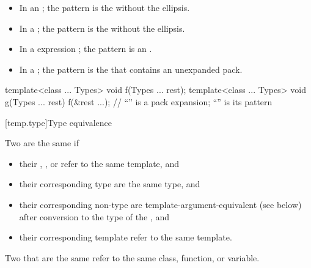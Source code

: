 \documentclass{wg21}
\begin{document}
\begin{itemize}
\item In an  ; the pattern is
the  without the ellipsis.

\item In a  ; the pattern is
the  without the ellipsis.

\item In a  expression ; the pattern is an
.

\item In a  ;
the pattern is the 
that contains an unexpanded pack.
\end{itemize}

\begin{example}
    \begin{codeblock}
        template<class ... Types> void f(Types ... rest);
        template<class ... Types> void g(Types ... rest) {
            f(&rest ...);     // ``'' is a pack expansion; ``'' is its pattern
        }
    \end{codeblock}
\end{example}


[temp.type]{Type equivalence}

\pnum
{}%
Two  are the same if
\begin{itemize}
\item
their ,
, or
refer to the same template, and

\item
their corresponding type 
are the same type, and

\item
their corresponding non-type 
are template-argument-equivalent (see below)
after conversion to the type of the , and

\item
their corresponding template 
refer to the same template.
\end{itemize}
Two  that are the same
refer to the same class, function, or variable.
\end{document}
